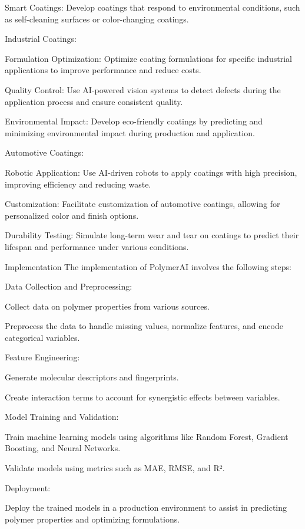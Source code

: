 \documentclass{article}
\begin{document}
	Smart Coatings: Develop coatings that respond to environmental conditions, such as self-cleaning surfaces or color-changing coatings.
	
	Industrial Coatings:
	
	Formulation Optimization: Optimize coating formulations for specific industrial applications to improve performance and reduce costs.
	
	Quality Control: Use AI-powered vision systems to detect defects during the application process and ensure consistent quality.
	
	Environmental Impact: Develop eco-friendly coatings by predicting and minimizing environmental impact during production and application.
	
	Automotive Coatings:
	
	Robotic Application: Use AI-driven robots to apply coatings with high precision, improving efficiency and reducing waste.
	
	Customization: Facilitate customization of automotive coatings, allowing for personalized color and finish options.
	
	Durability Testing: Simulate long-term wear and tear on coatings to predict their lifespan and performance under various conditions.
	
	Implementation
	The implementation of PolymerAI involves the following steps:
	
	Data Collection and Preprocessing:
	
	Collect data on polymer properties from various sources.
	
	Preprocess the data to handle missing values, normalize features, and encode categorical variables.
	
	Feature Engineering:
	
	Generate molecular descriptors and fingerprints.
	
	Create interaction terms to account for synergistic effects between variables.
	
	Model Training and Validation:
	
	Train machine learning models using algorithms like Random Forest, Gradient Boosting, and Neural Networks.
	
	Validate models using metrics such as MAE, RMSE, and R².
	
	Deployment:
	
	Deploy the trained models in a production environment to assist in predicting polymer properties and optimizing formulations.
	
\end{document}
